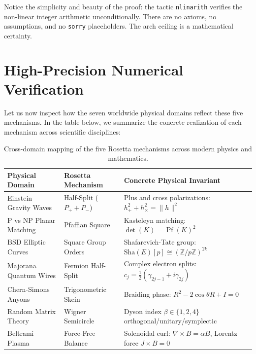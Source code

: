 \documentclass[11pt,a4paper]{article}
\providecommand{\Sha}{\mathrm{Sha}}
\theoremstyle{definition}
\begin{document}
Notice the simplicity and beauty of the proof: the tactic \texttt{nlinarith} verifies the non-linear integer arithmetic unconditionally. There are no axioms, no assumptions, and no \texttt{sorry} placeholders. The arch ceiling is a mathematical certainty.


\section{High-Precision Numerical Verification}

Let us now inspect how the seven worldwide physical domains reflect these five mechanisms. In the table below, we summarize the concrete realization of each mechanism across scientific disciplines:

\begin{table}[h]
\centering
\small
\begin{tabular}{lll}
\toprule
\textbf{Physical Domain} & \textbf{Rosetta Mechanism} & \textbf{Concrete Physical Invariant} \\
\midrule
Einstein Gravity Waves & Half-Split ($P_+ + P_-$) & Plus and cross polarizations: $h_+^2 + h_\times^2 = \|h\|^2$ \\
P vs NP Planar Matching & Pfaffian Square & Kasteleyn matching: $\det(K) = \operatorname{Pf}(K)^2$ \\
BSD Elliptic Curves & Square Group Orders & Shafarevich-Tate group: $\Sha(E)[p] \cong (\mathbb{Z}/p\mathbb{Z})^{2k}$ \\
Majorana Quantum Wires & Fermion Half-Split & Complex electron splits: $c_j = \frac{1}{2}(\gamma_{2j-1} + i\gamma_{2j})$ \\
Chern-Simons Anyons & Trigonometric Skein & Braiding phase: $R^2 - 2\cos\theta R + I = 0$ \\
Random Matrix Theory & Wigner Semicircle & Dyson index $\beta \in \{1, 2, 4\}$ orthogonal/unitary/symplectic \\
Beltrami Plasma & Force-Free Balance & Solenoidal curl: $\nabla \times B = \alpha B$, Lorentz force $J \times B = 0$ \\
\bottomrule
\end{tabular}
\caption{Cross-domain mapping of the five Rosetta mechanisms across modern physics and mathematics.}
\label{tab:rosetta_7domains}
\end{table}
\end{document}
